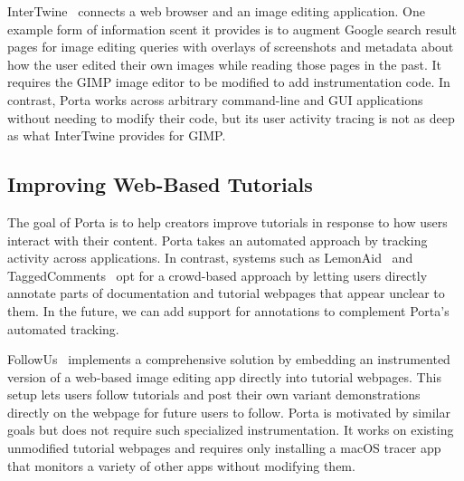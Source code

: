 InterTwine~\cite{Fourney2014} connects a web browser and an image
editing application. One example form of information scent it provides
is to augment Google search result pages for image editing queries with
overlays of screenshots and metadata about how the user edited their own
images while reading those pages in the past. It requires the GIMP image
editor to be modified to add instrumentation code. In contrast, Porta
works across arbitrary command-line and GUI applications without needing
to modify their code, but its user activity tracing is not as deep as
what InterTwine provides for GIMP.


\subsection{Improving Web-Based Tutorials}

The goal of Porta is to help creators improve tutorials in response to
how users interact with their content. Porta takes an automated approach
by tracking activity across applications. In contrast, systems such as
LemonAid~\cite{Chilana2012} and TaggedComments~\cite{Bunt2014} opt for a
crowd-based approach by letting users directly annotate parts of
documentation and tutorial webpages that appear unclear to them. In the
future, we can add support for annotations to complement Porta's
automated tracking.

FollowUs~\cite{Lafreniere2013} implements a comprehensive solution by
embedding an instrumented version of a web-based image editing app
directly into tutorial webpages. This setup lets users follow
tutorials and post their own variant demonstrations directly on the
webpage
for future users to follow. Porta is motivated by similar goals but does
not require such specialized instrumentation. It works on existing
unmodified tutorial webpages and requires only installing a macOS tracer
app that monitors a variety of other apps without modifying them.
